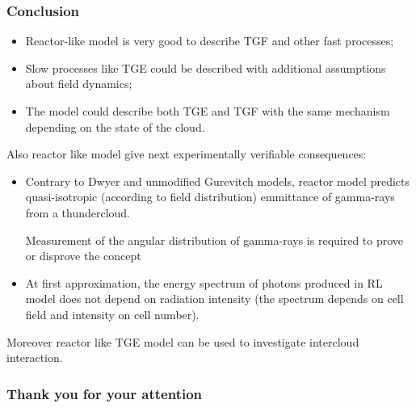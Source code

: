 \documentclass[8pt,pdf,hyperref={unicode}]{beamer}
\begin{document}
\begin{frame}
\frametitle{Conclusion}
				\begin{itemize}
	\item Reactor-like model is very good to describe TGF and other fast processes;
	\item Slow processes like TGE could be described with additional assumptions about field dynamics;
	\item The model could describe both TGE and TGF with the same mechanism depending on the state of the cloud.
\end{itemize}
Also reactor like model give next experimentally verifiable consequences:
\begin{itemize}
	\item Contrary to Dwyer and unmodified Gurevitch models, reactor model predicts quasi-isotropic (according to field distribution) emmittance of gamma-rays from a thundercloud.
	
	Measurement of the angular distribution of gamma-rays is required to prove or disprove the concept
	
	\item At first approximation, the energy spectrum of photons produced in RL model does not depend on radiation intensity (the spectrum depends on cell field and intensity on cell number).
\end{itemize}
Moreover reactor like TGE model can be used to investigate intercloud interaction.
\end{frame}

\begin{frame}
\frametitle{Thank you for your attention}

\end{frame}
\end{document}
